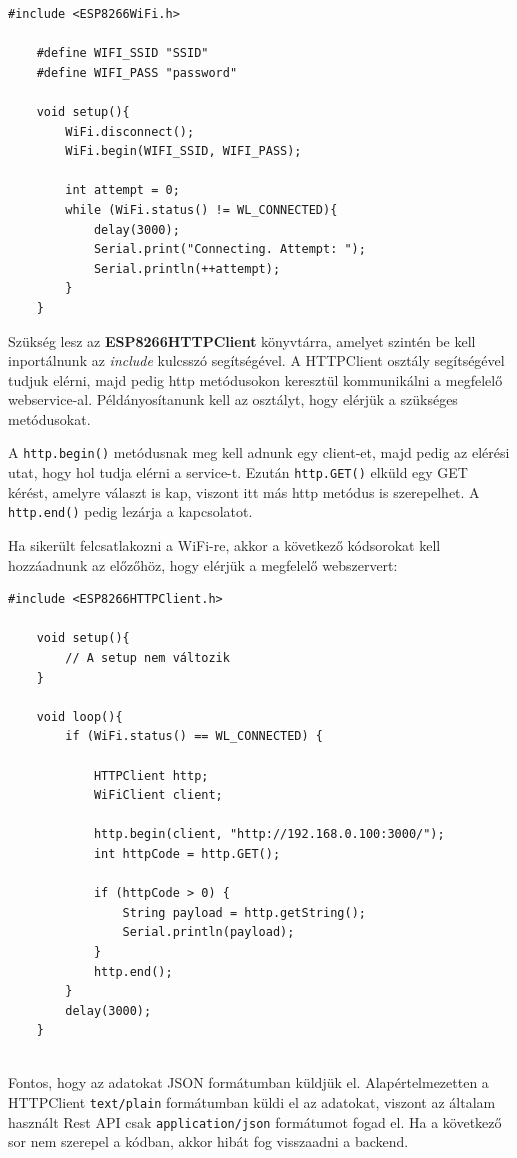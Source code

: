 \documentclass[
]{thesis-ekf}
\theoremstyle{definition}
\theoremstyle{remark}
\begin{document}
\begin{lstlisting}[caption={Wifi-re kapcsolódás példa}]
    #include <ESP8266WiFi.h>
    
    #define WIFI_SSID "SSID"
    #define WIFI_PASS "password"
    
    void setup(){
        WiFi.disconnect();
        WiFi.begin(WIFI_SSID, WIFI_PASS);

        int attempt = 0;
        while (WiFi.status() != WL_CONNECTED){
            delay(3000);
            Serial.print("Connecting. Attempt: ");
            Serial.println(++attempt);
        }
    }
\end{lstlisting}

Szükség lesz az \textbf{ESP8266HTTPClient} könyvtárra, amelyet szintén be kell inportálnunk az \emph{include} kulcsszó segítségével. A HTTPClient osztály segítségével tudjuk elérni, majd pedig http metódusokon keresztül kommunikálni a megfelelő webservice-al. Példányosítanunk kell az osztályt, hogy elérjük a szükséges metódusokat.

A \texttt{http.begin()} metódusnak meg kell adnunk egy client-et, majd pedig az elérési utat, hogy hol tudja elérni a service-t. Ezután \texttt{http.GET()} elküld egy GET kérést, amelyre választ is kap, viszont itt más http metódus is szerepelhet. A \texttt{http.end()} pedig lezárja a kapcsolatot.

Ha sikerült felcsatlakozni a WiFi-re, akkor a következő kódsorokat kell hozzáadnunk az előzőhöz, hogy elérjük a megfelelő webszervert:

\begin{lstlisting}[caption={HTTPClient kódok}]
    #include <ESP8266HTTPClient.h>

    void setup(){
        // A setup nem változik
    }

    void loop(){
        if (WiFi.status() == WL_CONNECTED) {
 
            HTTPClient http;
            WiFiClient client;
 
            http.begin(client, "http://192.168.0.100:3000/");
            int httpCode = http.GET();
 
            if (httpCode > 0) {
                String payload = http.getString();
                Serial.println(payload);
            }
            http.end();
        }
        delay(3000);
    }
    
\end{lstlisting}

Fontos, hogy az adatokat JSON formátumban küldjük el. Alapértelmezetten a HTTPClient \texttt{text/plain} formátumban küldi el az adatokat, viszont az általam használt Rest API csak \texttt{application/json} formátumot fogad el. Ha a következő sor nem szerepel a kódban, akkor hibát fog visszaadni a backend.
\end{document}
